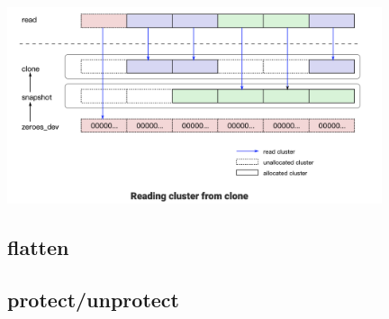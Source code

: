 \begin{center}
\includegraphics[width=11cm]{../imgs/clone-read.png}
\end{center}

\subsection{flatten}

\subsection{protect/unprotect}
